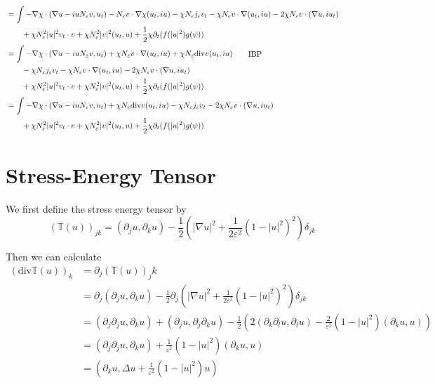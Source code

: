 \documentclass[a4paper]{article}
\renewcommand{\div}{\mathrm{div}}
\begin{document}
\begin{align}
  &= \int_{}^{} - \nabla \chi \cdot ( \nabla u - iuN_\varepsilon v, u_t) - N_\varepsilon v \cdot \nabla \chi (u_t, iu) - \chi N_\varepsilon
  j_\varepsilon v_t - \chi N_\varepsilon v \cdot \nabla (u_t, iu) - 2 \chi
  N_\varepsilon v \cdot (\nabla u, iu_t) \nonumber \\
  &\quad \quad + \chi N_\varepsilon^2 |u|^2 v_t \cdot v + \chi N_\varepsilon^2 |v|^2 (u_t, u) + \frac{1}{2} \chi \partial_t (f(|u|^2) g(\psi)) \nonumber \\
  &= \int_{}^{} - \nabla \chi \cdot (\nabla u - iu N_\varepsilon v, u_t) + \chi N_\varepsilon v \cdot \nabla (u_t, iu) + \chi N_\varepsilon \div v
  (u_t, iu) \quad \quad \parbox{5cm}{IBP} \nonumber \\
  &\quad \quad - \chi N_\varepsilon j_\varepsilon v_t - \chi N_\varepsilon v \cdot \nabla (u_t, iu) - 2 \chi
  N_\varepsilon v \cdot (\nabla u, iu_t) \nonumber \\
  &\quad \quad + \chi N_\varepsilon^2 |u|^2 v_t \cdot v + \chi N_\varepsilon^2 |v|^2 (u_t, u) + \frac{1}{2} \chi \partial_t (f(|u|^2) g(\psi)) \nonumber \\
  &= \int_{}^{} - \nabla \chi \cdot (\nabla u - iu N_\varepsilon v, u_t) + \chi N_\varepsilon \div v (u_t, iu) - \chi N_\varepsilon j_\varepsilon v_t - 2 \chi
  N_\varepsilon v \cdot (\nabla u, iu_t) \nonumber \\
  &\quad \quad + \chi N_\varepsilon^2 |u|^2 v_t \cdot v + \chi N_\varepsilon^2 |v|^2 (u_t, u) + \frac{1}{2} \chi \partial_t (f(|u|^2) g(\psi))
\end{align}

\section{Stress-Energy Tensor}
We first define the stress energy tensor by
\begin{equation}
  (\mathbb{T}(u))_{jk} = (\partial_j u, \partial_k u) - \frac{1}{2} \left( |\nabla u|^2 + \frac{1}{2 \varepsilon^2} (1 - |u|^2)^2 \right) \delta_{jk}
  \label{eqn:stress_energy}
\end{equation}

Then we can calculate
\begin{align}
  (\div \mathbb{T}(u))_k &= \partial_j (\mathbb{T}(u))_jk \nonumber \\
  &= \partial_j (\partial_j u, \partial_k u) - \frac{1}{2} \partial_j \left( |\nabla u|^2 + \frac{1}{2 \varepsilon^2} ( 1 - |u|^2)^2 \right)
  \delta_{jk} \nonumber \\
  &= (\partial_j \partial_j u, \partial_k u) + (\partial_j u, \partial_j \partial_k u) - \frac{1}{2} \left( 2( \partial_k \partial_l u, \partial_l u)
  - \frac{2}{\varepsilon^2} (1- |u|^2) (\partial_k u, u) \right) \nonumber \\
  &= (\partial_j \partial_j u, \partial_k u) + \frac{1}{\varepsilon^2} (1-|u|^2) (\partial_k u, u) \nonumber \\
  &= ( \partial_k u, \Delta u + \frac{1}{\varepsilon^2} (1 - |u|^2)u)
  \label{eqn:div_stress_energy_comp}
\end{align}
\end{document}
